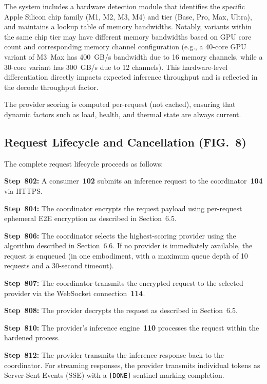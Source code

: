 \documentclass[11pt,letterpaper]{article}
\begin{document}
The system includes a hardware detection module that identifies the specific Apple Silicon chip family (M1, M2, M3, M4) and tier (Base, Pro, Max, Ultra), and maintains a lookup table of memory bandwidths. Notably, variants within the same chip tier may have different memory bandwidths based on GPU core count and corresponding memory channel configuration (e.g., a 40-core GPU variant of M3~Max has 400~GB/s bandwidth due to 16 memory channels, while a 30-core variant has 300~GB/s due to 12 channels). This hardware-level differentiation directly impacts expected inference throughput and is reflected in the decode throughput factor.

The provider scoring is computed per-request (not cached), ensuring that dynamic factors such as load, health, and thermal state are always current.

\subsection{Request Lifecycle and Cancellation (FIG.~8)}

The complete request lifecycle proceeds as follows:

\textbf{Step~802:} A consumer~\textbf{102} submits an inference request to the coordinator~\textbf{104} via HTTPS.

\textbf{Step~804:} The coordinator encrypts the request payload using per-request ephemeral E2E encryption as described in Section~6.5.

\textbf{Step~806:} The coordinator selects the highest-scoring provider using the algorithm described in Section~6.6. If no provider is immediately available, the request is enqueued (in one embodiment, with a maximum queue depth of 10 requests and a 30-second timeout).

\textbf{Step~807:} The coordinator transmits the encrypted request to the selected provider via the WebSocket connection~\textbf{114}.

\textbf{Step~808:} The provider decrypts the request as described in Section~6.5.

\textbf{Step~810:} The provider's inference engine~\textbf{110} processes the request within the hardened process.

\textbf{Step~812:} The provider transmits the inference response back to the coordinator. For streaming responses, the provider transmits individual tokens as Server-Sent Events (SSE) with a \texttt{[DONE]} sentinel marking completion.
\end{document}

